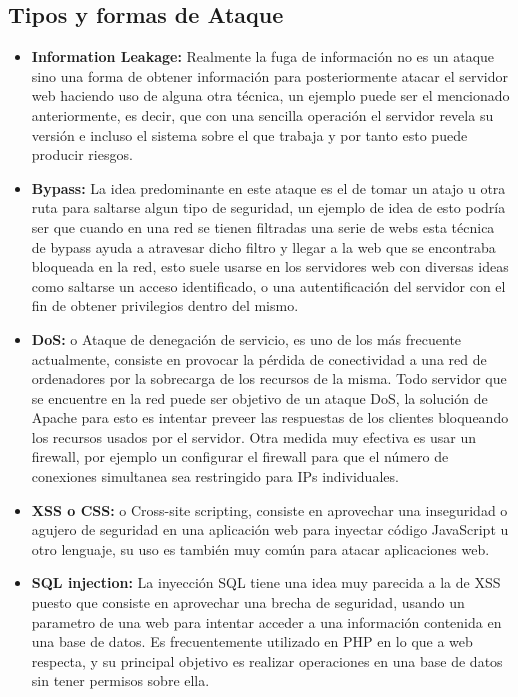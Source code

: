 \documentclass[a4paper, 10pt]{article} %
\begin{document}
\subsection{Tipos y formas de Ataque}
\begin{itemize}
\item \textbf{Information Leakage:} Realmente la fuga de información no es un ataque sino una forma de obtener información para posteriormente atacar el servidor web haciendo uso de alguna otra técnica, un ejemplo puede ser el mencionado anteriormente, es decir, que con una sencilla operación el servidor revela su versión e incluso el sistema sobre el que trabaja y por tanto esto puede producir riesgos.
\item \textbf{Bypass:} La idea predominante en este ataque es el de tomar un atajo u otra ruta para saltarse algun tipo de seguridad, un ejemplo de idea de esto podría ser que cuando en una red se tienen filtradas una serie de webs esta técnica de bypass ayuda a atravesar dicho filtro y llegar a la web que se encontraba bloqueada en la red, esto suele usarse en los servidores web con diversas ideas como saltarse un acceso identificado, o una autentificación del servidor con el fin de obtener privilegios dentro del mismo.
\item \textbf{DoS:} o Ataque de denegación de servicio, es uno de los más frecuente actualmente, consiste en provocar la pérdida de conectividad a una red de ordenadores por la sobrecarga de los recursos de la misma.\cite{3} Todo servidor que se encuentre en la red puede ser objetivo de un ataque DoS, la solución de Apache para esto es intentar preveer las respuestas de los clientes bloqueando los recursos usados por el servidor.
Otra medida muy efectiva es usar un firewall, por ejemplo un configurar el firewall para que el número de conexiones simultanea sea restringido para IPs individuales.
\item \textbf{XSS o CSS:} o Cross-site scripting, consiste en aprovechar una inseguridad o agujero de seguridad en una aplicación web para inyectar código JavaScript u otro lenguaje, su uso es también muy común para atacar aplicaciones web.
\item \textbf{SQL injection:} La inyección SQL tiene una idea muy parecida a la de XSS puesto que consiste en aprovechar una brecha de seguridad, usando un parametro de una web para intentar acceder a una información contenida en una base de datos. Es frecuentemente utilizado en PHP en lo que a web respecta, y su principal objetivo es realizar operaciones en una base de datos sin tener permisos sobre ella.
\end{itemize}
\end{document}

